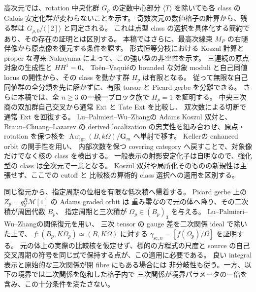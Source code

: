 高次元では、rotation 中央化群 $G_\rho$ の定数中心部分
$\langle T\rangle$ を除いても各 class の Galois 安定化群が変わらないことを示す。
奇数次元の数値格子の計算から、残る群は
$G_{\rho,0}/\langle[2]\rangle$ と同定される。
これは点型 class の選択を具体化する簡約であり、その存在の証明とは区別する。
本稿ではさらに、最高次線束 $M_P$ の右随伴像から原点像を復元する条件を課す。
形式恒等分枝における Koszul 計算と proper な導来 Nakayama によって、この強い型の非空性を示す。
三連続の原点対象の生成性と $HH^1=0$、
To\"en--Vaqui\'e\cite[Proposition~3.20, Corollary~3.24]{NFMToenVaquieModuli}の
bounded な対象 moduli と自己同値 locus の開性から、その class を動かす群 $H_p$ は有限となる。
従って無限な自己同値群の全分類を先に解かずに、有限 torsor と Picard gerbe を分離できる。
さらに本稿では、全 $n\ge3$ の一般一ブロック族で $H_p=1$ を証明する。
中央三次商の双加群自己交叉から通常 Ext と Tate Ext を比較し、
双次数による切断で通常 Ext を回復する。
Lu--Palmieri--Wu--Zhang\cite[Theorem~2.4, Corollary~2.5]{NFMLPWZKoszul}の
Adams Koszul 双対と、Braun--Chuang--Lazarev
\cite[Proposition~3.17, Theorems~3.18, 5.3]{NFMBCLLocalization}の
derived localization の忠実性を組み合わせ、原点・rotation を保つ核を
$\operatorname{Aut}_{\mathrm{gr}}(B,k\Omega)/\mathbf G_m$ へ単射で移す。
Keller\cite[Sections~9.3--9.4]{NFMKellerOrbit}の enhanced orbit の関手性を用い、
内部次数を保つ covering category へ戻すことで、対象像だけでなく核の class を検出する。
一般表示の射影安定化子は自明なので、強化型の class は全次元で一意となる。
Koszul 双対や局所化そのものの新規性は主張せず、ここでの cutoff と
比較核の算術的 class 選択への適用を区別する。

同じ復元から、指定周期の位相を有限な低次積へ帰着する。
Picard gerbe 上の $Z_p=q_Y^R\mathcal M[1]$ の Adams graded orbit は
重み零なので元の体へ降り、その二次積が周囲代数 $B_p$、
指定周期と三次積が $\Omega_p\in(B_p)_3$ を与える。
Lu--Palmieri--Wu--Zhang\cite[Corollary~B]{NFMLPWZExt}の関係復元を用い、
三次 tensor の gauge 差を二次関係 ideal で除いた上で、
$f:(B_p,K\Omega_p)\simeq(B,K\Omega)$ に対する
$\gamma_{\mathrm{sc},n}=[f(\Omega_p)/\Omega]$ を証明する。
元の体上の実際の比較核を仮定せず、標的の方程式の尺度と
source の自己交叉周期の符号を同じ式で保持する点が、この適用に必要である。
良い integral 表示と原始的な三次関係が閉 fibre にもある場合には
非分岐性も従う。一方、以下の境界では二次関係を飽和した格子内で
三次関係が境界パラメータの一倍を含み、この十分条件を満たさない。

